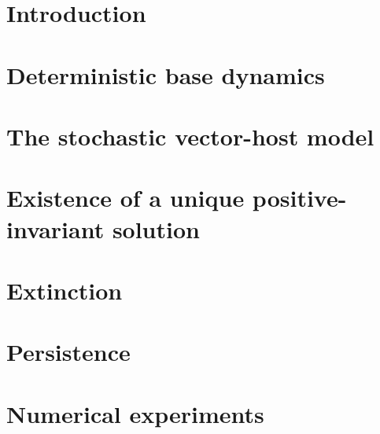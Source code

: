 \documentclass[3p,sort&compress,times]{elsarticle}
\theoremstyle{plain}
\theoremstyle{definition}
\begin{document}
    
    \section{Introduction}
    \section{Deterministic base dynamics}
        
    \section{The stochastic vector-host model}
        
    \section{Existence of a unique positive-invariant solution}
        
    \section{Extinction}
        
    \section{Persistence}
        
    \section{Numerical experiments}
%
    
    
\end{document}
